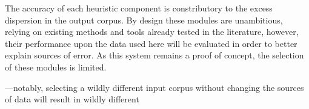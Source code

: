 The accuracy of each heuristic component is constributory to the excess dispersion in the output corpus.  By design these modules are unambitious, relying on existing methods and tools already tested in the literature, however, their performance upon the data used here will be evaluated in order to better explain sources of error.  As this system remains a proof of concept, the selection of these modules is limited.







---notably, selecting a wildly different input corpus without changing the sources of data will result in wildly different 




